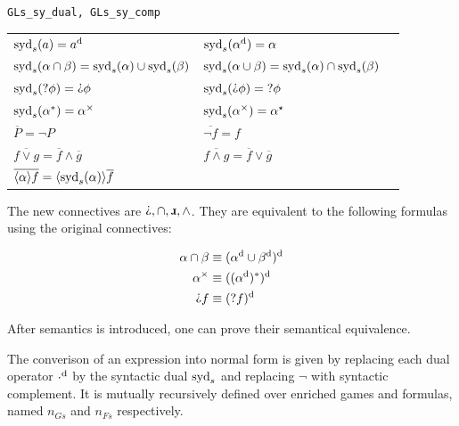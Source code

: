 \medskip

\begin{bdefinition}
\texttt{GLs\_sy\_dual, GLs\_sy\_comp}

\begin{tabular}{l l l}
 $\operatorname{syd}_s(a)=a^\text{d}$ 
 & $\operatorname{syd}_s(\alpha^\text{d})=\alpha$ 
 & \\
 $\operatorname{syd}_s(\alpha \cap \beta) = \operatorname{syd}_s(\alpha) \cup \operatorname{syd}_s(\beta)$
 & $\operatorname{syd}_s(\alpha\cup\beta)=\operatorname{syd}_s(\alpha)\cap \operatorname{syd}_s(\beta)$ 
 & \\
 $\syd_s(\Test\phi)=\DTest\phi$ 
 & $\syd_s(\DTest \phi)=\Test\phi$ 
 & \\ 
 $\operatorname{syd}_s(\alpha^*) = \alpha^\times$ & $\operatorname{syd}_s(\alpha^\times) = \alpha^\star$

\medskip \\

 $\overline{P} = \neg P$ 
 & $\overline{\neg f} = f$ \\
 $\overline{f \vee g} = \overline{f} \wedge \overline{g}$
 & $\overline{f \wedge g} = \overline{f} \vee \overline{g}$ \\
 $\overline{\langle\alpha\rangle f} = \langle \operatorname{syd}_s(\alpha)\rangle \overline{f}$
\end{tabular}    
\end{bdefinition}


\medskip



The new connectives are $\DTest, \cap, \DRec, \wedge$. They are equivalent to the following formulas using the original connectives:

\begin{align*}
    \alpha \cap \beta &\equiv \Dual{(\Dual{\alpha} \cup \Dual{\beta})} \\
    \alpha^\times &\equiv \Dual{((\Dual{\alpha})^*)} \\
    \DTest f &\equiv \Dual{(\Test f)}
\end{align*}

After semantics is introduced, one can prove their semantical equivalence.

The converison of an \GLs{} expression into normal form is given by replacing each dual operator $\cdot^\text{d}$ by the syntactic dual $\operatorname{syd}_s$ and replacing $\neg$ with syntactic complement. It is mutually recursively defined over enriched \RGL{} games and formulas, named $n_{Gs}$ and $n_{Fs}$ respectively. 

